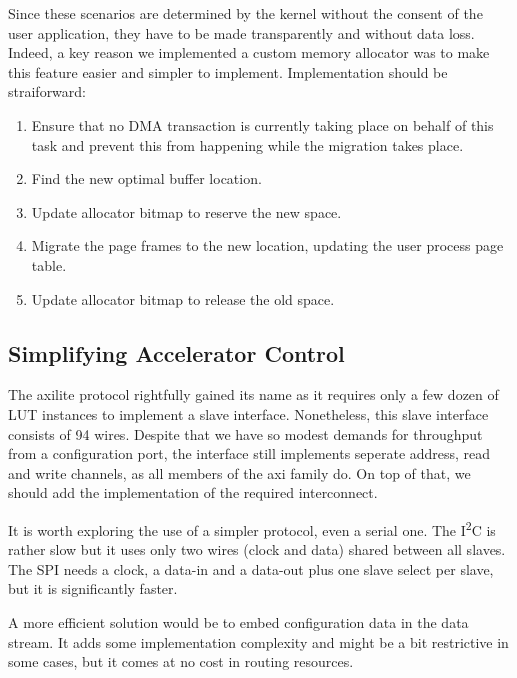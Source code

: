Since these scenarios are determined by the kernel without the consent of the user application, they have to be made transparently
and without data loss. Indeed, a key reason we implemented a custom memory allocator was to make this feature easier and simpler
to implement. Implementation should be straiforward:

\begin{enumerate}
\item	Ensure that no DMA transaction is currently taking place on behalf of this task 
	and prevent this from happening while the migration takes place.
\item	Find the new optimal buffer location.
\item	Update allocator bitmap to reserve the new space.
\item	Migrate the page frames to the new location, updating the user process page table.
\item	Update allocator bitmap to release the old space.
\end{enumerate}


\subsection{Simplifying Accelerator Control}

The \gls{axilite} protocol rightfully gained its name as it requires only a few dozen of LUT instances to implement a slave interface.
Nonetheless, this slave interface consists of 94 wires. Despite that we have so modest demands for throughput from a configuration
port, the interface still implements seperate address, read and write channels, as all members of the \gls{axi} family do.
On top of that, we should add the implementation of the required interconnect.

It is worth exploring the use of a simpler protocol, even a serial one. The I\textsuperscript{2}C is rather slow but it uses only
two wires (clock and data) shared between all slaves. The SPI needs a clock, a data-in and a data-out plus one slave select per slave,
but it is significantly faster.

A more efficient solution would be to embed configuration data in the data stream. It adds some implementation complexity
and might be a bit restrictive in some cases, but it comes at no cost in routing resources.


